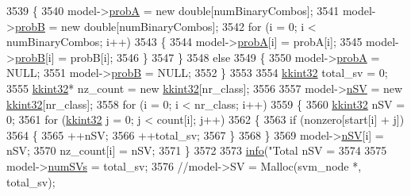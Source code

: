 \begin{DoxyCode}
{3539     \{
3540       model->\hyperlink{struct_s_v_m289___m_f_s_1_1_svm___model_ae32212566d46d6d9cafbddd37dcfbada}{probA} = \textcolor{keyword}{new} \textcolor{keywordtype}{double}[numBinaryCombos];
3541       model->\hyperlink{struct_s_v_m289___m_f_s_1_1_svm___model_a4849dabb9dde1adde990980c6c7e1737}{probB} = \textcolor{keyword}{new} \textcolor{keywordtype}{double}[numBinaryCombos];
3542       \textcolor{keywordflow}{for}  (i = 0;  i < numBinaryCombos;  i++)
3543       \{
3544         model->\hyperlink{struct_s_v_m289___m_f_s_1_1_svm___model_ae32212566d46d6d9cafbddd37dcfbada}{probA}[i] = probA[i];
3545         model->\hyperlink{struct_s_v_m289___m_f_s_1_1_svm___model_a4849dabb9dde1adde990980c6c7e1737}{probB}[i] = probB[i];
3546       \}
3547     \}
3548     \textcolor{keywordflow}{else}
3549     \{
3550       model->\hyperlink{struct_s_v_m289___m_f_s_1_1_svm___model_ae32212566d46d6d9cafbddd37dcfbada}{probA} = NULL;
3551       model->\hyperlink{struct_s_v_m289___m_f_s_1_1_svm___model_a4849dabb9dde1adde990980c6c7e1737}{probB} = NULL;
3552     \}
3553 
3554     \hyperlink{namespace_k_k_b_a8fa4952cc84fda1de4bec1fbdd8d5b1b}{kkint32} total\_sv = 0;
3555     \hyperlink{namespace_k_k_b_a8fa4952cc84fda1de4bec1fbdd8d5b1b}{kkint32}*  nz\_count = \textcolor{keyword}{new} \hyperlink{namespace_k_k_b_a8fa4952cc84fda1de4bec1fbdd8d5b1b}{kkint32}[nr\_class];
3556 
3557     model->\hyperlink{struct_s_v_m289___m_f_s_1_1_svm___model_a99c49e2824661c212c1599dcd636d2c0}{nSV} = \textcolor{keyword}{new} \hyperlink{namespace_k_k_b_a8fa4952cc84fda1de4bec1fbdd8d5b1b}{kkint32}[nr\_class];
3558     \textcolor{keywordflow}{for}  (i = 0;  i < nr\_class;  i++)
3559     \{
3560       \hyperlink{namespace_k_k_b_a8fa4952cc84fda1de4bec1fbdd8d5b1b}{kkint32} nSV = 0;
3561       \textcolor{keywordflow}{for}  (\hyperlink{namespace_k_k_b_a8fa4952cc84fda1de4bec1fbdd8d5b1b}{kkint32} j = 0;  j < count[i];  j++)
3562       \{
3563         \textcolor{keywordflow}{if}  (nonzero[start[i] + j])
3564         \{  
3565           ++nSV;
3566           ++total\_sv;
3567         \}
3568       \}
3569       model->\hyperlink{struct_s_v_m289___m_f_s_1_1_svm___model_a99c49e2824661c212c1599dcd636d2c0}{nSV}[i] = nSV;
3570       nz\_count[i]   = nSV;
3571     \}
3572     
3573     \hyperlink{svm2_8cpp_ab834c069665121a3467868539fde9101}{info}(\textcolor{stringliteral}{"Total nSV = %
3574 
3575     model->\hyperlink{struct_s_v_m289___m_f_s_1_1_svm___model_a9d1cb317006096158440daf45c809f0c}{numSVs} = total\_sv;
3576     \textcolor{comment}{//model->SV = Malloc(svm\_node *, total\_sv);}
}}
\end{DoxyCode}
